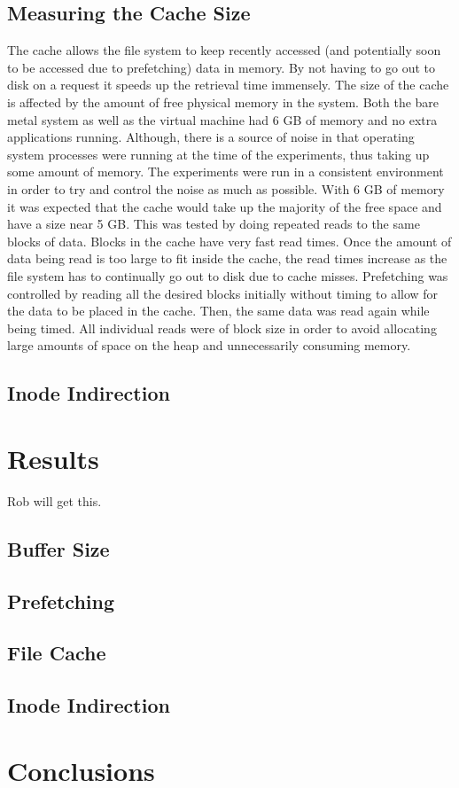 \documentclass[letterpaper,twocolumn,10pt]{article}
\begin{document}
\subsection{Measuring the Cache Size}
The cache allows the file system to keep recently accessed (and potentially soon to be accessed due to prefetching) data in memory. 
By not having to go out to disk on a request it speeds up the retrieval time immensely. 
The size of the cache is affected by the amount of free physical memory in the system. 
Both the bare metal system as well as the virtual machine had 6 GB of memory and no extra applications running. 
Although, there is a source of noise in that operating system processes were running at the time of the experiments, thus taking up some amount of memory. 
The experiments were run in a consistent environment in order to try and control the noise as much as possible. 
With 6 GB of memory it was expected that the cache would take up the majority of the free space and have a size near 5 GB. 
This was tested by doing repeated reads to the same blocks of data. 
Blocks in the cache have very fast read times. 
Once the amount of data being read is too large to fit inside the cache, the read times increase as the file system has to continually go out to disk due to cache misses. 
Prefetching was controlled by reading all the desired blocks initially without timing to allow for the data to be placed in the cache. 
Then, the same data was read again while being timed. 
All individual reads were of block size in order to avoid allocating large amounts of space on the heap and unnecessarily consuming memory.

\subsection{Inode Indirection}


\section{Results}
Rob will get this.
\subsection{Buffer Size}
\subsection{Prefetching}
\subsection{File Cache}
\subsection{Inode Indirection}

\section{Conclusions}

{\footnotesize 
}

\theendnotes
\end{document}
